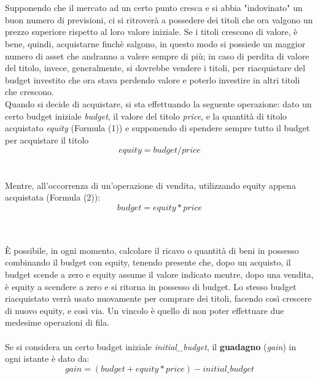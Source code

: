 \documentclass[a4paper,12pt]{report}
\begin{document}
\\~\\
Supponendo che il mercato ad un certo punto cresca e si abbia "indovinato" un buon numero di previsioni, ci si ritroverà a possedere dei titoli che ora valgono un prezzo superiore rispetto al loro valore iniziale. Se i titoli crescono di valore, è bene, quindi, acquistarne finchè salgono, in questo modo si possiede un maggior numero di asset che andranno a valere sempre di più; in caso di perdita di valore del titolo, invece, generalmente, si dovrebbe vendere i titoli, per riacquistare del budget investito che ora stava perdendo valore e poterlo investire in altri titoli che crescono.\\
Quando si decide di acquistare, si sta effettuando la seguente operazione: dato un certo budget iniziale \textit{budget}, il valore del titolo \textit{price}, e la quantità di titolo acquistato \textit{equity} (Formula (1)) e supponendo di spendere sempre tutto il budget per acquistare il titolo
\\

\begin{equation}
equity=budget/price
\end{equation}
\\~\\
Mentre, all'occorrenza di un'operazione di vendita, utilizzando equity appena acquistata (Formula (2)):\\

\begin{equation}
budget=equity*price
\end{equation}

\\~\\
È possibile, in ogni momento, calcolare il ricavo o quantità di beni in possesso combinando il budget con equity, tenendo presente che, dopo un acquisto, il budget scende a zero e equity assume il valore indicato mentre, dopo una vendita, è equity a scendere a zero e si ritorna in possesso di budget. Lo stesso budget riacquistato verrà usato nuovamente per comprare dei titoli, facendo così crescere di nuovo equity, e così via. Un vincolo è quello di non poter effettuare due medesime operazioni di fila. 
\\~\\ 
Se si considera un certo budget iniziale \textit{initial\_budget}, il \textbf{guadagno} (\textit{gain}) in ogni istante è dato da:
\\
\begin{equation}
gain=(budget+equity*price)-initial\_budget
\end{equation}
\end{document}
